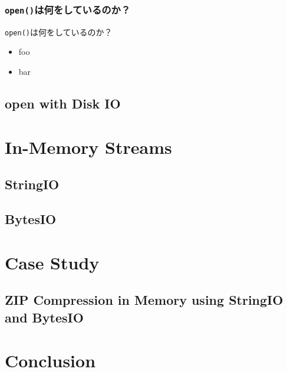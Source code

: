 \documentclass[dvipdfmx,12pt,notheorems]{beamer}
\theoremstyle{definition}
\begin{document}
\begin{frame}\frametitle{\texttt{open()}は何をしているのか？}
\begin{block}{\texttt{open()}は何をしているのか？}
\begin{itemize}
\item foo
\item bar
\end{itemize}
\end{block}
\end{frame}

\subsection{open with Disk IO}

\section{In-Memory Streams}

\subsection{StringIO}

\subsection{BytesIO}

\section{Case Study}

\subsection{ZIP Compression in Memory using StringIO and BytesIO}

\section{Conclusion}
\end{document}
